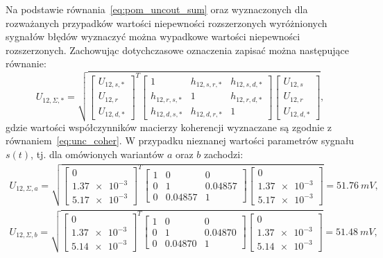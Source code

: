 Na podstawie równania~\eqref{eq:pom_uncout_sum} oraz wyznaczonych dla rozważanych przypadków wartości niepewności rozszerzonych wyróżnionych sygnałów błędów wyznaczyć można wypadkowe wartości niepewności rozszerzonych. Zachowując dotychczasowe oznaczenia zapisać można następujące równanie:
\begin{equation}
U_{12,\Sigma,*} = \sqrt{
\begin{bmatrix}
U_{12,s,*} \\ U_{12,r} \\ U_{12,d,*}
\end{bmatrix}^{T}
\begin{bmatrix}
1            & h_{12,s,r,*} & h_{12,s,d,*} \\
h_{12,r,s,*} &            1 & h_{12,r,d,*} \\
h_{12,d,s,*} & h_{12,d,r,*} &            1
\end{bmatrix}
\begin{bmatrix}
U_{12,s} \\ U_{12,r} \\ U_{12,d,*}
\end{bmatrix}}
\label{eq:pom_mono_all_unc_opt},
\end{equation}
gdzie wartości współczynników macierzy koherencji wyznaczane są zgodnie z równaniem~\eqref{eq:unc_coher}. W przypadku nieznanej wartości parametrów sygnału $s(t)$, tj. dla omówionych wariantów $a$ oraz $b$ zachodzi:
\begin{gather}
U_{12,\Sigma,a} = \sqrt{
\begin{bmatrix}
0 \\ \num{1.37e-3} \\ \num{5.17e-3}
\end{bmatrix}^{T}
\begin{bmatrix}
1       &       0 &       0 \\
0       &       1 & 0.04857 \\
0       & 0.04857 &       1
\end{bmatrix}
\begin{bmatrix}
0 \\ \num{1.37e-3} \\ \num{5.17e-3}
\end{bmatrix}} = \qty{51.76}{mV}
\label{eq:pom_mono_all_unc_a}, \\
U_{12,\Sigma,b} =  \sqrt{
\begin{bmatrix}
0 \\ \num{1.37e-3} \\ \num{5.14e-3}
\end{bmatrix}^{T}
\begin{bmatrix}
1       &       0 &       0 \\
0       &       1 & 0.04870 \\
0       & 0.04870 &       1
\end{bmatrix}
\begin{bmatrix}
0 \\ \num{1.37e-3} \\ \num{5.14e-3}
\end{bmatrix}} = \qty{51.48}{mV}
\label{eq:pom_mono_all_unc_b},
\end{gather}
